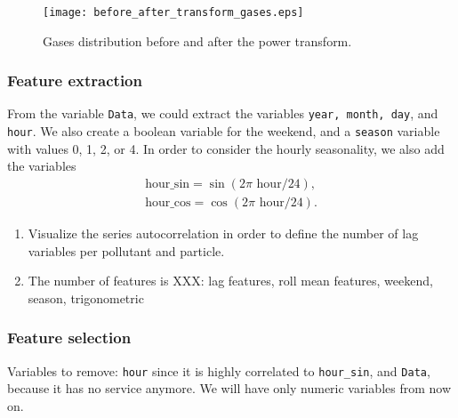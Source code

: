 \begin{figure*}
    \centering
    \texttt{[image: before\_after\_transform\_gases.eps]}
    \caption{Gases distribution before and after the power transform.}
    \label{fig:before-after-transform}
\end{figure*}
 
\subsubsection{Feature extraction}

From the variable {\tt Data}, we could extract the variables {\tt year, month,
day}, and {\tt hour}. We also create a boolean variable for the weekend, and a
{\tt season} variable with values 0, 1, 2, or 4. In
order to consider the hourly seasonality, we also add the variables
\begin{gather*}
    \text{hour\_sin} = \sin(2\pi \text{ hour}/24), \\
    \text{hour\_cos} = \cos(2\pi \text{ hour}/24). 
\end{gather*}

\begin{enumerate}
    \item Visualize the series autocorrelation in order to define the number
    of lag variables per pollutant and particle.
    \item The number of features is XXX: lag features, roll mean features,
    weekend, season, trigonometric  
\end{enumerate}

\subsubsection{Feature selection}

Variables to remove: {\tt hour} since it is highly correlated to {\tt hour\_sin}, and {\tt Data}, because it has no service anymore. We will have
only numeric variables from now on. 


